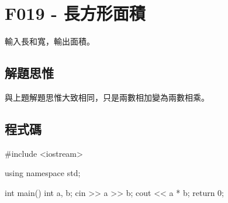 \section{F019 - 長方形面積}
輸入長和寬，輸出面積。
\subsection{解題思惟}
與上題解題思惟大致相同，只是兩數相加變為兩數相乘。
\subsection{程式碼}
\begin{cppcode}
#include <iostream>

using namespace std;

int main()
{
	int a, b;
	cin >> a >> b;
	cout << a * b;
	return 0;
}
\end{cppcode}
